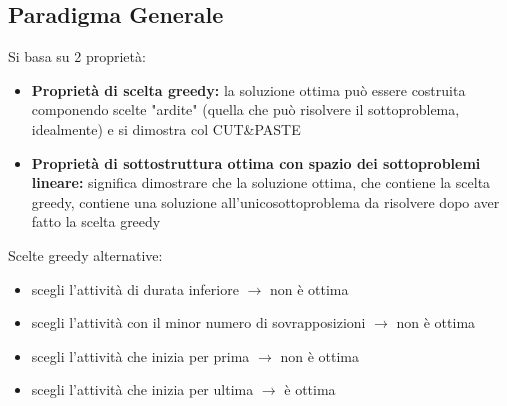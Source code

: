 \subsection{Paradigma Generale}
Si basa su 2 proprietà:
\begin{itemize}
    \item \textbf{Proprietà di scelta greedy:} la soluzione ottima può essere costruita componendo scelte "ardite" (quella che può risolvere il sottoproblema, idealmente) e si dimostra col CUT\&PASTE
    \item \textbf{Proprietà di sottostruttura ottima con spazio dei sottoproblemi lineare:} significa dimostrare che la soluzione ottima, che contiene la scelta greedy, contiene una soluzione all'unicosottoproblema da risolvere dopo aver fatto la scelta greedy
\end{itemize}
Scelte greedy alternative:
\begin{itemize}
    \item scegli l'attività di durata inferiore $\rightarrow$ non è ottima
    \item scegli l'attività con il minor numero di sovrapposizioni $\rightarrow$ non è ottima
    \item scegli l'attività che inizia per prima $\rightarrow$ non è ottima
    \item scegli l'attività che inizia per ultima $\rightarrow$ è ottima
\end{itemize}

\newpage